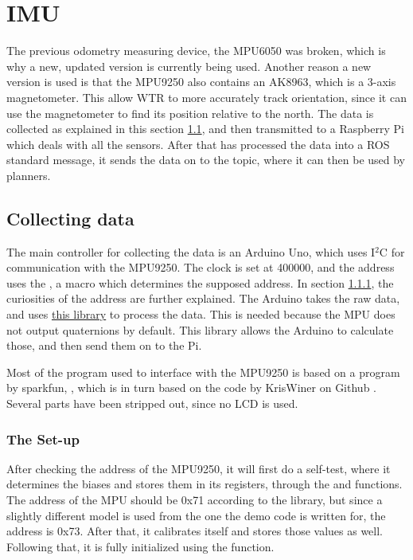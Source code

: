 \section{IMU}
The previous odometry measuring device, the MPU6050 \cite{MPU6050} was broken, which is why a new, updated version is currently being used.
Another reason a new version is used is that the MPU9250 \cite{MPU9250} also contains an AK8963, which is a 3-axis magnetometer.
This allow WTR to more accurately track orientation, since it can use the magnetometer to find its position relative to the north.
The data is collected as explained in this section \ref{sec::collect}, and then transmitted to a Raspberry Pi which deals with all the sensors.
After that has processed the data into a ROS standard message, it sends the data on to the topic, where it can then be used by planners.

\subsection{Collecting data} \label{sec::collect}
The main controller for collecting the data is an Arduino Uno, which uses I$^{2}$C for communication with the MPU9250.
The clock is set at 400000, and the address uses the , a macro which determines the supposed address.
In section \ref{sec::set-up}, the curiosities of the address are further explained.
The Arduino takes the raw data, and uses \href{https://github.com/sparkfun/SparkFun_MPU-9250_Breakout_Arduino_Library}{this library} to process the data.
This is needed because the MPU does not output quaternions by default.
This library allows the Arduino to calculate those, and then send them on to the Pi.

Most of the program used to interface with the MPU9250 is based on a program by sparkfun, \cite{sparkfunMPU9250}, which is in turn based on the code by KrisWiner on Github \cite{kriswiner}.
Several parts have been stripped out, since no LCD is used.


\subsubsection{The Set-up} \label{sec::set-up}
After checking the address of the MPU9250, it will first do a self-test, where it determines the biases and stores them in its registers, through the  and  functions.
The address of the MPU should be 0x71 according to the library, but since a slightly different model is used from the one the demo code is written for, the address is 0x73.
After that, it calibrates itself and stores those values as well.
Following that, it is fully initialized using the  function.

